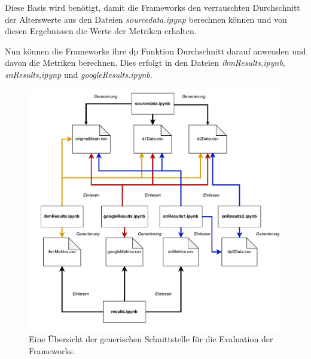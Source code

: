 Diese Basis wird benötigt, damit die Frameworks den verrauschten Durchschnitt der Alterswerte aus den Dateien \textit{sourcedata.ipynp} berechnen können und von diesen Ergebnissen die Werte der Metriken erhalten.

Nun können die Frameworks ihre \gls{dp} Funktion Durchschnitt darauf anwenden und davon die Metriken berechnen. Dies erfolgt in den Dateien \textit{ibmResults.ipynb}, \textit{snResults,ipynp} und \textit{googleResults.ipynb}.

\begin{figure}[!htbp]
	\centering
	\includegraphics[scale=0.6]{./images/interface_overview.pdf}
	\caption{Eine Übersicht der generischen Schnittstelle für die Evaluation der Frameworks.}
	\label{fig:interface_overview}
\end{figure}

